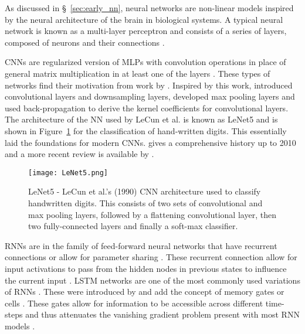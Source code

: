 As discussed in §~\ref{sec:early_nn}, neural networks are non-linear models inspired by the neural architecture of the brain in biological systems. A typical neural network is known as a multi-layer perceptron and consists of a series of layers, composed of neurons and their connections \citep{Goodfellow2016}. 

\acp{CNN} are regularized version of MLPs with convolution operations in place of general matrix multiplication in at least one of the layers \citep{LeCun1989}. These types of networks find their motivation from work by \citet{Hubel1959, Hubel1962}. Inspired by this work, \citet{Fukushima1982} introduced convolutional layers and downsampling layers, \citet{Zhou1988} developed max pooling layers and \cite{LeCun1990} used back-propagation to derive the kernel coefficients for convolutional layers. The architecture of the NN used by LeCun et al. is known as LeNet5 and is shown in Figure~\ref{fig:CNN_arch} for the classification of hand-written digits. This essentially laid the foundations for modern CNNs. \cite{LeCun2010} gives a comprehensive history up to 2010 and a more recent review is available by \cite{Khan2020}.

\begin{figure}[ht!]
	\centering
	\texttt{[image: LeNet5.png]}
	\caption[LeNet5 CNN architecture to classify handwritten characters.]{LeNet5 - LeCun et al.’s (1990) CNN architecture used to classify handwritten digits. This consists of two sets of convolutional and max pooling layers, followed by a flattening convolutional layer, then two fully-connected layers and finally a soft-max classifier.}
	\label{fig:CNN_arch}
\end{figure}

\acp{RNN} are in the family of feed-forward neural networks that have recurrent connections or allow for parameter sharing \citep{Lang1988}. These recurrent connection allow for input activations to pass from the hidden nodes in previous states to influence the current input \citep{Waibel1989, Lang1990}. 
\ac{LSTM} networks are one of the most commonly used variations of RNNs \citep{Patterson2017}. These were introduced by \citet{Hochreiter1997} and add the concept of memory gates or cells \citep{Graves2012, Gers1999}. These gates allow for information to be accessible across different time-steps and thus attenuates the vanishing gradient problem present with most RNN models \citep{Patterson2017}.

